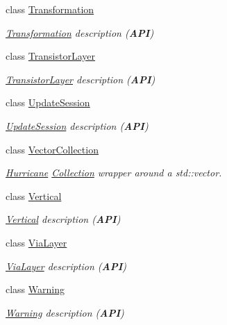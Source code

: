 \begin{DoxyCompactItemize}
class \hyperlink{classHurricane_1_1Transformation}{Transformation}
\begin{DoxyCompactList}\small\item\em \hyperlink{classHurricane_1_1Transformation}{Transformation} description ({\bfseries A\+PI}) \end{DoxyCompactList}\item 
class \hyperlink{classHurricane_1_1TransistorLayer}{Transistor\+Layer}
\begin{DoxyCompactList}\small\item\em \hyperlink{classHurricane_1_1TransistorLayer}{Transistor\+Layer} description ({\bfseries A\+PI}) \end{DoxyCompactList}\item 
class \hyperlink{classHurricane_1_1UpdateSession}{Update\+Session}
\begin{DoxyCompactList}\small\item\em \hyperlink{classHurricane_1_1UpdateSession}{Update\+Session} description ({\bfseries A\+PI}) \end{DoxyCompactList}\item 
class \hyperlink{classHurricane_1_1VectorCollection}{Vector\+Collection}
\begin{DoxyCompactList}\small\item\em \hyperlink{namespaceHurricane}{Hurricane} \hyperlink{classHurricane_1_1Collection}{Collection} wrapper around a std\+::vector. \end{DoxyCompactList}\item 
class \hyperlink{classHurricane_1_1Vertical}{Vertical}
\begin{DoxyCompactList}\small\item\em \hyperlink{classHurricane_1_1Vertical}{Vertical} description ({\bfseries A\+PI}) \end{DoxyCompactList}\item 
class \hyperlink{classHurricane_1_1ViaLayer}{Via\+Layer}
\begin{DoxyCompactList}\small\item\em \hyperlink{classHurricane_1_1ViaLayer}{Via\+Layer} description ({\bfseries A\+PI}) \end{DoxyCompactList}\item 
class \hyperlink{classHurricane_1_1Warning}{Warning}
\begin{DoxyCompactList}\small\item\em \hyperlink{classHurricane_1_1Warning}{Warning} description ({\bfseries A\+PI}) \end{DoxyCompactList}\end{DoxyCompactItemize}
